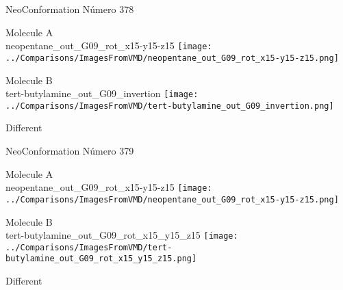\vtab[-3cm]
\begin{center}
{\large NeoConformation \tab Número 378}
\end{center}
\begin{multicols}{2}
\begin{center}
Molecule A \\ 
neopentane\_out\_G09\_rot\_x15-y15-z15
\texttt{[image: ../Comparisons/ImagesFromVMD/neopentane\_out\_G09\_rot\_x15-y15-z15.png]}
\\
\vtab

\columnbreak
Molecule B \\ 
tert-butylamine\_out\_G09\_invertion
\texttt{[image: ../Comparisons/ImagesFromVMD/tert-butylamine\_out\_G09\_invertion.png]}
\\
\vtab


\end{center}
\end{multicols}
\begin{center}
\textcolor{NavyBlue}{\Large Different}
\end{center}

 \newpage

\vtab[-3cm]
\begin{center}
{\large NeoConformation \tab Número 379}
\end{center}
\begin{multicols}{2}
\begin{center}
Molecule A \\ 
neopentane\_out\_G09\_rot\_x15-y15-z15
\texttt{[image: ../Comparisons/ImagesFromVMD/neopentane\_out\_G09\_rot\_x15-y15-z15.png]}
\\
\vtab

\columnbreak
Molecule B \\ 
tert-butylamine\_out\_G09\_rot\_x15\_y15\_z15
\texttt{[image: ../Comparisons/ImagesFromVMD/tert-butylamine\_out\_G09\_rot\_x15\_y15\_z15.png]}
\\
\vtab


\end{center}
\end{multicols}
\begin{center}
\textcolor{NavyBlue}{\Large Different}
\end{center}

 \newpage

